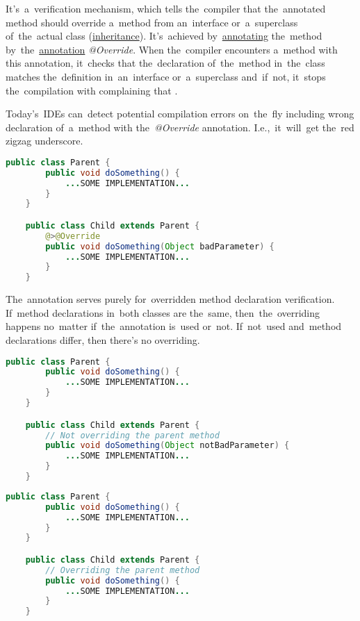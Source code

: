 \label{javaoverride}
It's~a~verification mechanism, which tells the~compiler that the~annotated method should override a~method from an~interface or~a~superclass of~the~actual class (\hyperref[inheritance]{inheritance}).
It's~achieved by~\hyperref[javaannotation]{annotating} the~method by~the~\hyperref[javaannotation]{annotation} \textit{@Override}.
When the~compiler encounters a~method with this annotation, it~checks that the~declaration of~the~method in~the~class matches the~definition in~an~interface or~a~superclass and~if~not, it~stops the~compilation with complaining that .

\note Today's~IDEs can~detect potential compilation errors on~the~fly including wrong declaration of~a~method with the~\textit{@Override} annotation.
I.e.,~it~will~get the~red zigzag underscore.

\begin{lstlisting}[language=Java]
    public class Parent {
        public void doSomething() {
            ...SOME IMPLEMENTATION...
        }
    }

    public class Child extends Parent {
        @>@Override
        public void doSomething(Object badParameter) {
            ...SOME IMPLEMENTATION...
        }
    }
\end{lstlisting}

\warning The~annotation serves purely for~overridden method declaration verification.
If~method declarations in~both classes are the~same, then~the~overriding happens no~matter if~the~annotation is~used or~not.
If~not~used and~method declarations differ, then there's no overriding.

\begin{lstlisting}[language=Java]
    public class Parent {
        public void doSomething() {
            ...SOME IMPLEMENTATION...
        }
    }

    public class Child extends Parent {
        // Not overriding the parent method
        public void doSomething(Object notBadParameter) {
            ...SOME IMPLEMENTATION...
        }
    }
\end{lstlisting}

\begin{lstlisting}[language=Java]
    public class Parent {
        public void doSomething() {
            ...SOME IMPLEMENTATION...
        }
    }

    public class Child extends Parent {
        // Overriding the parent method
        public void doSomething() {
            ...SOME IMPLEMENTATION...
        }
    }
\end{lstlisting}

